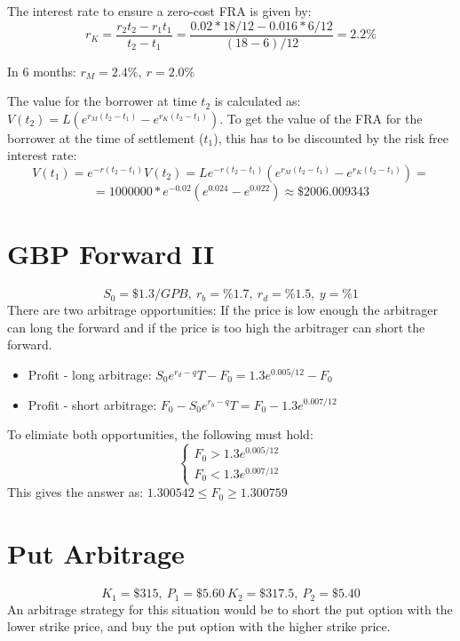 \documentclass{article}
\begin{document}
The interest rate to ensure a zero-cost FRA is given by:
$$r_K = \frac{r_2t_2 - r_1t_1}{t_2-t_1} = \frac{0.02 * 18/12 - 0.016*6/12}{(18-6)/12} = 2.2\%$$

In 6 months: $r_M = 2.4\%, \ r=2.0\%$

The value for the borrower at time $t_2$ is calculated as: $ V(t_2) = L\left( e^{r_M(t_2-t_1)} - e^{r_K(t_2-t_1)} \right)$. To get the value of the FRA for the borrower at the time of settlement ($t_1$), this has to be discounted by the risk free interest rate:
$$V(t_1) = e^{-r(t_2-t_1)}V(t_2) = Le^{-r(t_2-t_1)}\left( e^{r_M(t_2-t_1)} - e^{r_K(t_2-t_1)} \right) = $$
$$ = 1000000 * e^{-0.02} \left( e^{0.024} - e^{0.022} \right) \approx \$2006.009343$$

\section{GBP Forward II}
$$S_0 = \$1.3/GPB, \ r_b = \%1.7, \ r_d = \%1.5, \ y=\%1$$
There are two arbitrage opportunities: If the price is low enough the arbitrager can long the forward and if the price is too high the arbitrager can short the forward.
\begin{itemize}
	\item Profit - long arbitrage: $S_0e^{r_{d}-q}T - F_0= 1.3e^{0.005/12} - F_0$
	\item Profit - short arbitrage: $F_0 - S_0e^{r_{b}-q}T = F_0 - 1.3e^{0.007/12}$
\end{itemize}

To elimiate both opportunities, the following must hold: 
$$\begin{cases} F_0 > 1.3e^{0.005/12} \\ F_0 < 1.3e^{0.007/12} \end{cases}$$
This gives the answer as: $1.300542 \leq F_0 \geq 1.300759$


\section{Put Arbitrage}
$$K_1 = \$315, \ P_1 = \$5.60 \ K_2 = \$317.5, \ P_2 = \$5.40$$
An arbitrage strategy for this situation would be to short the put option with the lower strike price, and buy the put option with the higher strike price. 
\end{document}
